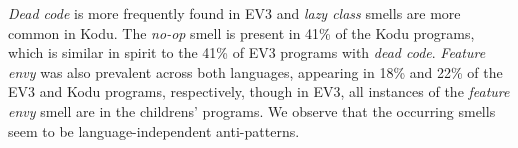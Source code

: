 \documentclass[conference]{IEEEtran}
\begin{document}
\emph{Dead code} is more frequently found in EV3 and \emph{lazy class} smells are more common in Kodu. The \emph{no-op} smell is present in 41\% of the Kodu programs, which is similar in spirit to the 41\% of EV3 programs with \emph{dead code}. \emph{Feature envy} was also prevalent across both languages, appearing in 18\% and 22\% of the EV3 and Kodu programs, respectively, though in EV3, all instances of the \emph{feature envy} smell are in the childrens' programs. 
We observe that the occurring smells seem to be language-independent anti-patterns. 



\end{document}
